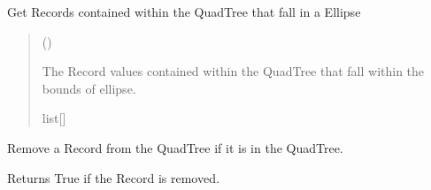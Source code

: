 \documentclass[letterpaper,10pt,english]{sphinxmanual}
\begin{document}
\begin{fulllineitems}

\begin{fulllineitems}
\label{\detokenize{quadtree:geotrees.quadtree.QuadTree.query_ellipse}}
\pysigstartsignatures
\pysiglinewithargsret
{}
{\sphinxparamcomma {}}
{}
\pysigstopsignatures
\sphinxAtStartPar
Get Records contained within the QuadTree that fall in a
Ellipse
\begin{quote}\begin{description}
\sphinxAtStartPar
{} ({\hyperref[\detokenize{shape:geotrees.shape.Ellipse}]{}})

\sphinxAtStartPar
The Record values contained within the QuadTree that fall
within the bounds of ellipse.

\sphinxAtStartPar
list{[}{\hyperref[\detokenize{record:geotrees.record.Record}]{}}{]}

\end{description}\end{quote}

\end{fulllineitems}


\begin{fulllineitems}
\label{\detokenize{quadtree:geotrees.quadtree.QuadTree.remove}}
\pysigstartsignatures
\pysiglinewithargsret
{}
{}
{}
\pysigstopsignatures
\sphinxAtStartPar
Remove a Record from the QuadTree if it is in the QuadTree.

\sphinxAtStartPar
Returns True if the Record is removed.
\begin{quote}\begin{description}
\sphinxAtStartPar
{}

\end{description}\end{quote}

\end{fulllineitems}


\end{fulllineitems}
\end{document}
